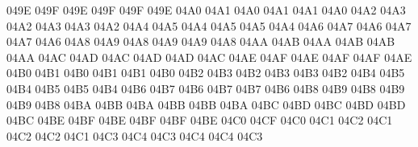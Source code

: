 \setcclcucx 049E 049F 049E %
\setcclcucx 049F 049F 049E %
\setcclcucx 04A0 04A1 04A0 %
\setcclcucx 04A1 04A1 04A0 %
\setcclcucx 04A2 04A3 04A2 %
\setcclcucx 04A3 04A3 04A2 %
\setcclcucx 04A4 04A5 04A4 %
\setcclcucx 04A5 04A5 04A4 %
\setcclcucx 04A6 04A7 04A6 %
\setcclcucx 04A7 04A7 04A6 %
\setcclcucx 04A8 04A9 04A8 %
\setcclcucx 04A9 04A9 04A8 %
\setcclcucx 04AA 04AB 04AA %
\setcclcucx 04AB 04AB 04AA %
\setcclcucx 04AC 04AD 04AC %
\setcclcucx 04AD 04AD 04AC %
\setcclcucx 04AE 04AF 04AE %
\setcclcucx 04AF 04AF 04AE %
\setcclcucx 04B0 04B1 04B0 %
\setcclcucx 04B1 04B1 04B0 %
\setcclcucx 04B2 04B3 04B2 %
\setcclcucx 04B3 04B3 04B2 %
\setcclcucx 04B4 04B5 04B4 %
\setcclcucx 04B5 04B5 04B4 %
\setcclcucx 04B6 04B7 04B6 %
\setcclcucx 04B7 04B7 04B6 %
\setcclcucx 04B8 04B9 04B8 %
\setcclcucx 04B9 04B9 04B8 %
\setcclcucx 04BA 04BB 04BA %
\setcclcucx 04BB 04BB 04BA %
\setcclcucx 04BC 04BD 04BC %
\setcclcucx 04BD 04BD 04BC %
\setcclcucx 04BE 04BF 04BE %
\setcclcucx 04BF 04BF 04BE %
\setcclcucx 04C0 04CF 04C0 %
\setcclcucx 04C1 04C2 04C1 %
\setcclcucx 04C2 04C2 04C1 %
\setcclcucx 04C3 04C4 04C3 %
\setcclcucx 04C4 04C4 04C3 %

